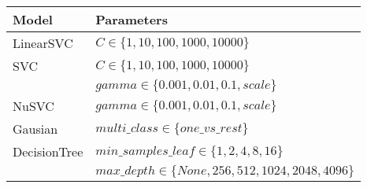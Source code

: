 \begin{tabular}{ll}
\toprule
        Model &                                                                                Parameters \\
\midrule
    LinearSVC &                                                          $C\in \{1, 10, 100, 1000, 10000\}$ \\
          SVC &                     $C\in \{1, 10, 100, 1000, 10000\}$\\ & $gamma\in \{0.001, 0.01, 0.1, scale\}$ \\
        NuSVC &                                                      $gamma\in \{0.001, 0.01, 0.1, scale\}$ \\
      Gausian &                                                            $multi\_class\in \{one\_vs\_rest\}$ \\
 DecisionTree &  $min\_samples\_leaf\in \{1, 2, 4, 8, 16\}$\\ & $max\_depth\in \{None, 256, 512, 1024, 2048, 4096\}$ \\
\bottomrule
\end{tabular}

